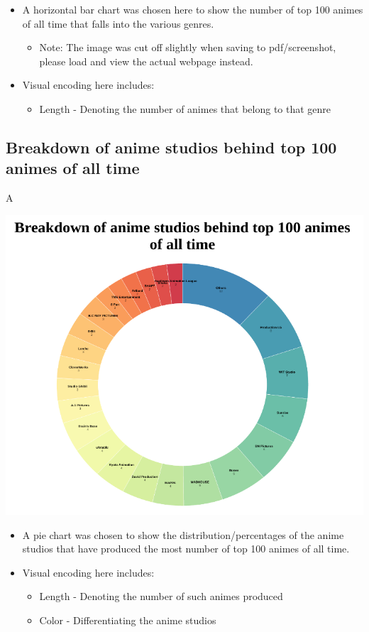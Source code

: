 \documentclass[a4paper, 11pt]{article}
\begin{document}
\begin{itemize}
\item A horizontal bar chart was chosen here to show the number of top 100 animes of all time that falls into the various genres.
\begin{itemize}
\item Note: The image was cut off slightly when saving to pdf/screenshot, please load and view the actual webpage instead.
\end{itemize}
\item Visual encoding here includes:
\begin{itemize}
\item Length - Denoting the number of animes that belong to that genre
\end{itemize}
\end{itemize}
\subsection{Breakdown of anime studios behind top 100 animes of all time}
\label{sec:org705235f}

A\begin{center}
\includegraphics[width=.9\linewidth]{./charts/anime_studios.png}
\end{center}

\begin{itemize}
\item A pie chart was chosen to show the distribution/percentages of the anime studios that have produced the most number of top 100 animes of all time.
\item Visual encoding here includes:
\begin{itemize}
\item Length - Denoting the number of such animes produced
\item Color - Differentiating the anime studios
\end{itemize}
\end{itemize}
\end{document}
